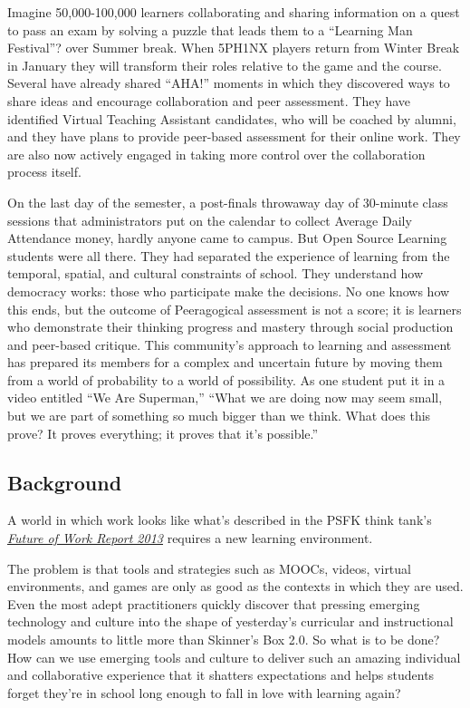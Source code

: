 Imagine 50,000-100,000 learners collaborating and sharing information on a quest
to pass an exam by solving a puzzle that leads them to a ``Learning Man
Festival''? over Summer break. When 5PH1NX players return from Winter
Break in January they will transform their roles relative to the game
and the course. Several have already shared ``AHA!'' moments in which
they discovered ways to share ideas and encourage collaboration and peer
assessment. They have identified Virtual Teaching Assistant candidates,
who will be coached by alumni, and they have plans to provide peer-based
assessment for their online work. They are also now actively engaged in
taking more control over the collaboration process itself.


On the last day of the semester, a post-finals throwaway
day of 30-minute class sessions that administrators put on the calendar
to collect Average Daily Attendance money, hardly anyone came to campus.
But Open Source Learning students were all there. They had separated the
experience of learning from the temporal, spatial, and cultural
constraints of school. They understand how democracy works: those who
participate make the decisions. No one knows how this ends, but the
outcome of Peeragogical assessment is not a score; it is learners who
demonstrate their thinking progress and mastery through social
production and peer-based critique. This community's approach to
learning and assessment has prepared its members for a complex and
uncertain future by moving them from a world of probability to a world
of possibility. As one student put it in a video entitled ``We Are
Superman,'' ``What we are doing now may seem small, but we are part of
something so much bigger than we think. What does this prove? It proves
everything; it proves that it's possible.''

\subsection{Background}\label{background}

A world in which work looks like what's described in the PSFK think
tank's
\emph{\href{http://www.slideshare.net/PSFK/psfk-presents-future-of-work-report}{Future
of Work Report 2013}} requires a new learning environment.

The problem is that tools and strategies such as MOOCs, videos, virtual
environments, and games are only as good as the contexts in which they
are used. Even the most adept practitioners quickly discover that
pressing emerging technology and culture into the shape of yesterday's
curricular and instructional models amounts to little more than
Skinner's Box 2.0. So what is to be done? How can we use emerging tools
and culture to deliver such an amazing individual and collaborative
experience that it shatters expectations and helps students forget
they're in school long enough to fall in love with learning again?

